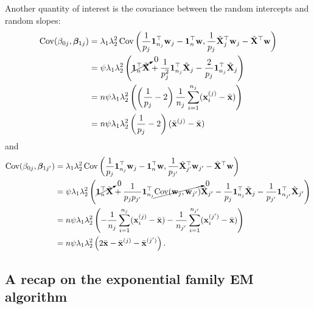 Another quantity of interest is the covariance between the random intercepts and random slopes:
\begin{align*}
  \operatorname{Cov}(\beta_{0j}, \boldsymbol{\beta}_{1j}) 
  &= \lambda_1\lambda_2^2  \operatorname{Cov}\left( \frac{1}{p_{j}} {\mathbf 1}_{n_j}^\top {\mathbf w}_{j} - {\mathbf 1}_n^\top {\mathbf w}, \frac{1}{p_{j}} \tilde{{\mathbf X}}_{j}^\top {\mathbf w}_{j} - \tilde{{\mathbf X}}^\top {\mathbf w}   \right) \\
  &= \psi\lambda_1\lambda_2^2  \left( \cancelto{0}{{\mathbf 1}_{n}^\top \tilde{{\mathbf X}}} + \frac{1}{p_{j}^2} {\mathbf 1}_{n_j}^\top \tilde{{\mathbf X}}_j  - \frac{2}{p_{j}} {\mathbf 1}_{n_{j}}^\top \tilde{{\mathbf X}}_{j} \right) \\
  &= n\psi\lambda_1\lambda_2^2  \left(  \left(\frac{1}{p_j} - 2 \right) \frac{1}{n_{j}} \sum_{i=1}^{n_j}({\mathbf x}_i^{(j)} - \bar {{\mathbf x}})  \right) \\
  &= n\psi\lambda_1\lambda_2^2 \left(\frac{1}{p_j} - 2 \right) ( \bar{{\mathbf x}}^{(j)}   -\bar {{\mathbf x}}  ) 
\end{align*}
and
\begin{align*}
  \operatorname{Cov}(\beta_{0j}, \boldsymbol{\beta}_{1j'}) 
  &= \lambda_1\lambda_2^2  \operatorname{Cov}\left( \frac{1}{p_{j}} {\mathbf 1}_{n_j}^\top {\mathbf w}_{j} - {\mathbf 1}_n^\top {\mathbf w}, \frac{1}{p_{j'}} \tilde{{\mathbf X}}_{j'}^\top {\mathbf w}_{j'} - \tilde{{\mathbf X}}^\top {\mathbf w}   \right) \\
  &= \psi\lambda_1\lambda_2^2  \left( \cancelto{0}{{\mathbf 1}_{n}^\top \tilde{{\mathbf X}}} + \frac{1}{p_{j}p_{j'}} {\mathbf 1}_{n_j}^\top \cancelto{0}{\operatorname{Cov}({\mathbf w}_j,{\mathbf w}_{j'})} \tilde{{\mathbf X}}_{j'} - \frac{1}{p_{j}} {\mathbf 1}_{n_j}^\top \tilde{{\mathbf X}}_j  - \frac{1}{p_{j'}} {\mathbf 1}_{n_{j'}}^\top \tilde{{\mathbf X}}_{j'} \right) \\
  &= n\psi\lambda_1\lambda_2^2  \left(  - \frac{1}{n_{j}} \sum_{i=1}^{n_j}({\mathbf x}_i^{(j)} - \bar {{\mathbf x}})  - \frac{1}{n_{j'}} \sum_{i=1}^{n_{j'}}({\mathbf x}_i^{(j')} - \bar {{\mathbf x}}) \right) \\
  &= n\psi\lambda_1\lambda_2^2  \left(  2\bar {{\mathbf x}} -  \bar{{\mathbf x}}^{(j)}  -  \bar {{\mathbf x}}^{(j')}  \right).
\end{align*}

\subsection{A recap on the exponential family EM algorithm}
\label{apx:expem}

